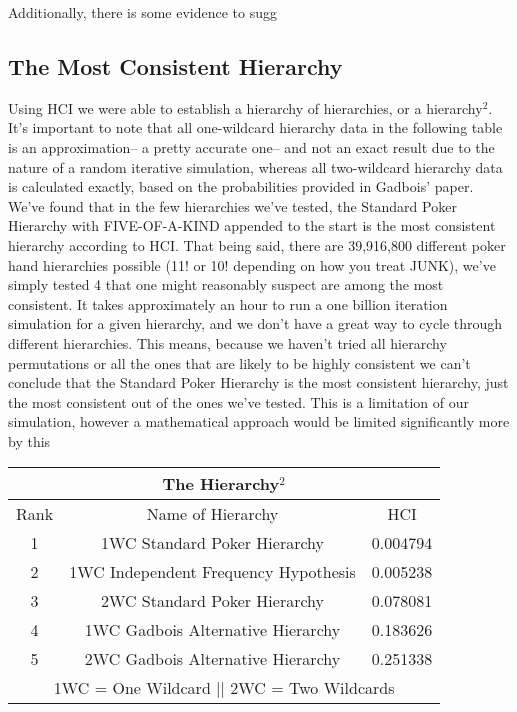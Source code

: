 \documentclass[16pt]{article}
\begin{document}
Additionally, there is some evidence to sugg

\subsection{The Most Consistent Hierarchy}
Using HCI we were able to establish a hierarchy of hierarchies, or a hierarchy$^2$. It's important to note that all one-wildcard hierarchy data in the following table is an approximation-- a pretty accurate one-- and not an exact result due to the nature of a random iterative simulation, whereas all two-wildcard hierarchy data is calculated exactly, based on the probabilities provided in Gadbois' paper. We've found that in the few hierarchies we've tested, the Standard Poker Hierarchy with FIVE-OF-A-KIND appended to the start is the most consistent hierarchy according to HCI. That being said, there are 39,916,800  different poker hand hierarchies possible (11! or 10! depending on how you treat JUNK), we've simply tested 4 that one might reasonably suspect are among the most consistent. It takes approximately an hour to run a one billion iteration simulation for a given hierarchy, and we don't have a great way to cycle through different hierarchies. This means, because we haven't tried all hierarchy permutations or all the ones that are likely to be highly consistent we can't conclude that the Standard Poker Hierarchy is the most consistent hierarchy, just the most consistent out of the ones we've tested. This is a limitation of our simulation, however a mathematical approach would be limited significantly more by this

\begin{center}
\begin{tabular}{ |c c c|} 
\hline
\multicolumn{3}{|c|}{\textbf{The Hierarchy$^2$}} \\
 \hline
 Rank & Name of Hierarchy & HCI\\ 
 \hline
 1 & 1WC Standard Poker Hierarchy & 0.004794 \\ 
 2 & 1WC Independent Frequency Hypothesis  & 0.005238\\
 3 & 2WC Standard Poker Hierarchy  & 0.078081\\
 4 & 1WC Gadbois Alternative Hierarchy  & 0.183626\\
 5 & 2WC Gadbois Alternative Hierarchy  & 0.251338\\
 \hline
 \multicolumn{3}{|c|}{1WC = One Wildcard || 2WC = Two Wildcards} \\
 \hline
\end{tabular}
\end{center}
\end{document}
